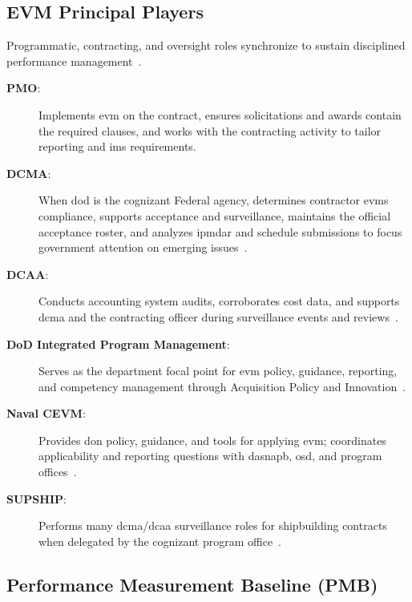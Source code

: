 \documentclass[../main.tex]{subfiles}
\begin{document}
\subsection{EVM Principal Players}
Programmatic, contracting, and oversight roles synchronize to sustain disciplined performance
management~\autocite{edo-3-6-1-evm-intro-2025,DoD-IPM-EVM-Definitions-2026,DoD-IPM-Policy-Guidance-2026,DON-CEVM-2026,DCMA-About-2026,DCMA-EVMS-Group-2026,DCAA-About-2026}.
\begin{description}
  \item[\textbf{PMO}:] Implements \ac{evm} on the contract, ensures solicitations and awards contain the required clauses, and works with the contracting activity to tailor reporting and \ac{ims} requirements.
  \item[\textbf{DCMA}:] When \ac{dod} is the cognizant Federal agency, determines contractor \ac{evms} compliance, supports acceptance and surveillance, maintains the official acceptance roster, and analyzes \ac{ipmdar} and schedule submissions to focus government attention on emerging issues~\autocite{DoD-IPM-EVM-Definitions-2026,DCMA-About-2026,DCMA-EVMS-Group-2026}.
  \item[\textbf{DCAA}:] Conducts accounting system audits, corroborates cost data, and supports \ac{dcma} and the contracting officer during surveillance events and reviews~\autocite{DCAA-About-2026}.
  \item[\textbf{DoD Integrated Program Management}:] Serves as the department focal point for \ac{evm} policy, guidance, reporting, and competency management through Acquisition Policy and Innovation~\autocite{DoD-IPM-Policy-Guidance-2026}.
  \item[\textbf{Naval CEVM}:] Provides \ac{don} policy, guidance, and tools for applying \ac{evm}; coordinates applicability and reporting questions with \ac{dasnapb}, \ac{osd}, and program offices~\autocite{DON-CEVM-2026}.
  \item[\textbf{SUPSHIP}:] Performs many \ac{dcma}/\ac{dcaa} surveillance roles for shipbuilding contracts when delegated by the cognizant program office~\autocite{DoD-IPM-EVM-Definitions-2026}.
\end{description}

\subsection{Performance Measurement Baseline (PMB)}
\end{document}
